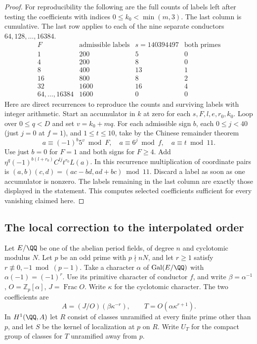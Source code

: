 \documentclass[a4paper,11pt]{article}
\theoremstyle{definition}
\theoremstyle{remark}
\newcommand{\ZZ}{\mathbb Z}\newcommand{\ord}{\operatorname{ord}}
\numberwithin{equation}{section}
\begin{document}
\begin{proof}
For reproducibility the following are the full counts of
labels left after testing the coefficients with indices
\(0\le k_0<\min(m,3)\). The last column is cumulative. The
last row applies to each of the nine separate conductors
\(64,128,\ldots,16384\).
\[
 \begin{array}{r|r|r|r}
 F&\text{admissible labels}&s=140394497&\text{both primes}\\ \hline
 1&200&5&0\\
 4&200&8&0\\
 8&400&13&1\\
 16&800&8&2\\
 32&1600&16&4\\
 64,\ldots,16384&1600&0&0
 \end{array}
\]
Here are direct recurrences to reproduce the counts and surviving
labels with integer arithmetic. Start an accumulator in \(k\)
at zero for each \(s,F,l,e,r_0,k_0\). Loop over \(0\le q<D\)
and set \(v=k_0+mq\). For each admissible sign \(b\), each
\(0\le j<40\) (just \(j=0\) at \(f=1\)), and \(1\le t\le10\),
take by the Chinese remainder theorem
\[
 a\equiv(-1)^b5^v\bmod F,\quad
 a\equiv6^j\bmod f,\quad a\equiv t\bmod11 .
\]
Use just \(b=0\) for \(F=1\) and both signs for \(F\ge4\).
Add \(\eta^q(-1)^{b(l+r_0)}C^{lj}t^{r_0}L(a)\).
In this recurrence multiplication of coordinate pairs is
\((a,b)(c,d)=(ac-bd,ad+bc)\bmod11\). Discard a label as
soon as one accumulator is nonzero. The labels remaining in
the last column are exactly those displayed in the statement.
This computes selected coefficients sufficient for every
vanishing claimed here.
\end{proof}

\subsection{The local correction to the interpolated order}\label{nav:IV-59}
Let \(E/\QQ\) be one of the abelian period fields, of degree \(n\)
and cyclotomic modulus \(N\). Let \(p\) be an odd prime with
\(p\nmid nN\), and let \(r\ge1\) satisfy
\(r\not\equiv0,-1\bmod(p-1)\). Take a character \(\alpha\) of
\(\operatorname{Gal}(E/\QQ)\) with \(\alpha(-1)=(-1)^r\).
Use its primitive character of conductor \(f\), and write
\(\beta=\alpha^{-1}\), \(O=\ZZ_p[\alpha]\), \(J=\operatorname{Frac}O\).
Write \(\kappa\) for the cyclotomic character. The two coefficients are
\[
 A=(J/O)(\beta\kappa^{-r}),\qquad T=O(\alpha\kappa^{r+1}).
\]
In \(H^1(\QQ,A)\) let \(R\) consist of classes unramified at every
finite prime other than \(p\), and let \(S\) be the kernel of
localization at \(p\) on \(R\). Write \(U_T\) for the compact group
of classes for \(T\) unramified away from \(p\).
\end{document}
